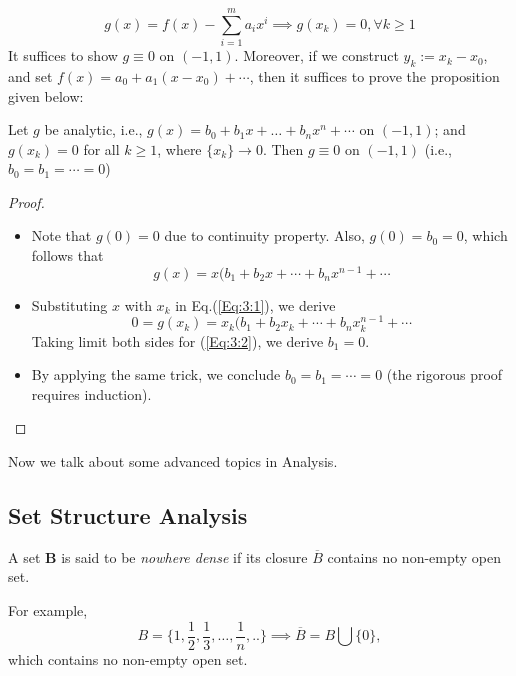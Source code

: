 \[
g(x) = f(x) - \sum_{i=1}^ma_ix^i\implies g(x_k)=0,\forall k\ge1
\]
It suffices to show $g\equiv0$ on $(-1,1)$. Moreover, if we construct $y_k:=x_k - x_0$, and set $f(x) = a_0+a_1(x-x_0)+\cdots$, then it suffices to prove the proposition given below:
\begin{proposition}\label{Pro:3:1}
Let $g$ be analytic, i.e., $g(x)= b_0+b_1x+\dots+b_nx^n+\cdots$ on $(-1,1)$; and $g(x_k)=0$ for all $k\ge1$, where $\{x_k\}\to0$. Then $g\equiv0$ on $(-1,1)$ (i.e., $b_0=b_1=\cdots=0$)
\end{proposition}
\begin{proof}
\begin{itemize}
\item
Note that $g(0)=0$ due to continuity property. Also, $g(0) = b_0=0$, which follows that
\begin{equation}
g(x) = x(b_1+b_2x+\cdots+b_nx^{n-1}+\cdots\label{Eq:3:1}
\end{equation}
\item
Substituting $x$ with $x_k$ in Eq.(\ref{Eq:3:1}), we derive
\begin{equation}
0=g(x_k) = x_k(b_1+b_2x_k+\cdots+b_nx^{n-1}_k+\cdots\label{Eq:3:2}
\end{equation}
Taking limit both sides for (\ref{Eq:3:2}), we derive $b_1=0$.
\item
By applying the same trick, we conclude $b_0=b_1=\cdots=0$ (the rigorous proof requires induction).
\end{itemize}
\end{proof}

Now we talk about some advanced topics in Analysis.

\subsection{Set Structure Analysis}
\begin{definition}
A set $\bm B$ is said to be \emph{nowhere dense} if its closure $\overline{B}$ contains no non-empty open set.
\end{definition}
For example,
\[
B = \{1,\frac{1}{2},\frac{1}{3},\dots,\frac{1}{n},..\}\implies
\overline{B} = B\bigcup\{0\},
\]
which contains no non-empty open set.

